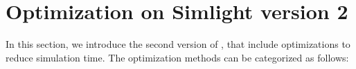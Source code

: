 
\section{Optimization on Simlight version 2}
\label{sec:slv62}

In this section, we introduce the second version of \simlight,
that include optimizations to reduce simulation time.
The optimization methods can be categorized as follows:
